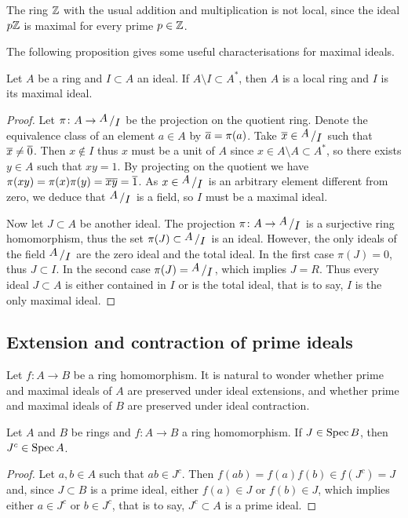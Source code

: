 \begin{example}
	The ring $\mathbb{Z}$ with the usual addition and multiplication is not local, since the ideal $p \mathbb{Z}$ is maximal for every prime $p \in \mathbb{Z}$.
\end{example}

The following proposition gives some useful characterisations for maximal ideals.

\begin{prop}
	Let $A$ be a ring and $I \subset A$ an ideal. If $A \setminus I \subset A^\ast$, then $A$ is a local ring and $I$ is its maximal ideal.
\end{prop}
\begin{proof}
	Let $\pi \colon A \rightarrow \quotient{A}{I}$ be the projection on the quotient ring. Denote the equivalence class of an element $a \in A$ by $\overline{a} = \pi(a)$. Take $\class{x} \in \quotient{A}{I}$ such that $\overline{x} \neq \overline{0}$. Then $x \not\in I$ thus $x$ must be a unit of $A$ since $x \in A \setminus A \subset A^\ast$, so there exists $y \in A$ such that $x y = 1$. By projecting on the quotient we have $\pi(x y) = \pi(x) \pi(y) = \overline{x} \overline{y} = \overline{1}$. As $x \in \quotient{A}{I}$ is an arbitrary element different from zero, we deduce that $\quotient{A}{I}$ is a field, so $I$ must be a maximal ideal.
	
	Now let $J \subset A$ be another ideal. The projection $\pi \colon A \rightarrow \quotient{A}{I}$ is a surjective ring homomorphism, thus the set $\pi(J) \subset \quotient{A}{I}$ is an ideal. However, the only ideals of the field $\quotient{A}{I}$ are the zero ideal and the total ideal. In the first case $\pi(J) = 0$, thus $J \subset I$. In the second case $\pi(J) = \quotient{A}{I}$, which implies $J = R$. Thus every ideal $J \subset A$ is either contained in $I$ or is the total ideal, that is to say, $I$ is the only maximal ideal.
\end{proof}

\subsection{Extension and contraction of prime ideals}

Let $f \colon A \rightarrow B$ be a ring homomorphism. It is natural to wonder whether prime and maximal ideals of $A$ are preserved under ideal extensions, and whether prime and maximal ideals of $B$ are preserved under ideal contraction. 

\begin{prop}
	Let $A$ and $B$ be rings and $f \colon A \rightarrow B$ a ring homomorphism. If $J \in \mathrm{Spec}\,B$, then $J^c \in \mathrm{Spec}\,A$.
\end{prop}
\begin{proof}
	Let $a, b \in A$ such that $a b \in J^c$. Then $f(a b) = f(a) f(b) \in f(J^c) = J$ and, since $J \subset B$ is a prime ideal, either $f(a) \in J$ or $f(b) \in J$, which implies either $a \in J^c$ or $b \in J^c$, that is to say, $J^c \subset A$ is a prime ideal.
\end{proof}

